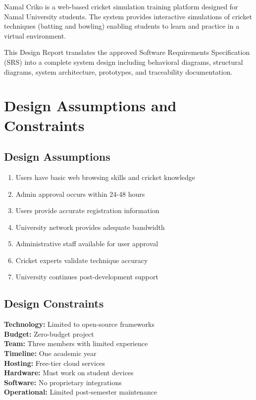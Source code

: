 \documentclass[12pt,a4paper]{article}
\begin{document}
Namal Criko is a web-based cricket simulation training platform designed for Namal University students. The system provides interactive simulations of cricket techniques (batting and bowling) enabling students to learn and practice in a virtual environment.

This Design Report translates the approved Software Requirements Specification (SRS) into a complete system design including behavioral diagrams, structural diagrams, system architecture, prototypes, and traceability documentation.

\section{Design Assumptions and Constraints}

\subsection{Design Assumptions}

\begin{enumerate}[itemsep=0.3em]
    \item Users have basic web browsing skills and cricket knowledge
    \item Admin approval occurs within 24-48 hours
    \item Users provide accurate registration information
    \item University network provides adequate bandwidth
    \item Administrative staff available for user approval
    \item Cricket experts validate technique accuracy
    \item University continues post-development support
\end{enumerate}

\subsection{Design Constraints}

\textbf{Technology:} Limited to open-source frameworks \\
\textbf{Budget:} Zero-budget project \\
\textbf{Team:} Three members with limited experience \\
\textbf{Timeline:} One academic year \\
\textbf{Hosting:} Free-tier cloud services \\
\textbf{Hardware:} Must work on student devices \\
\textbf{Software:} No proprietary integrations \\
\textbf{Operational:} Limited post-semester maintenance
\end{document}
